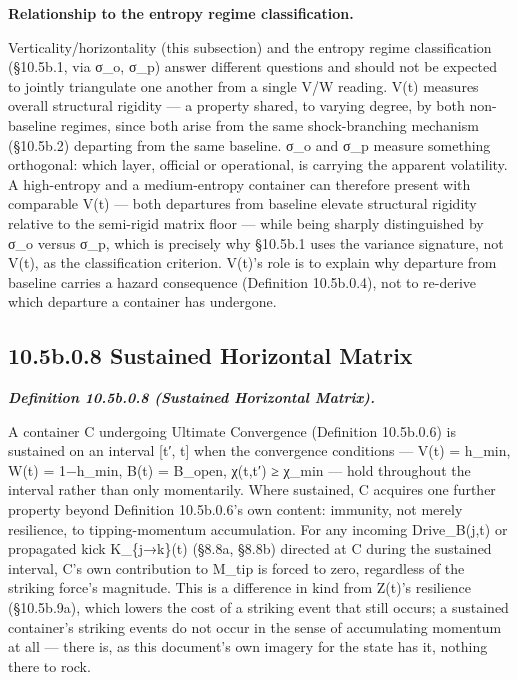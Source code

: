 \documentclass[
]{article}
\begin{document}
\textbf{Relationship to the entropy regime classification.}

Verticality/horizontality (this subsection) and the entropy regime
classification (§10.5b.1, via σ\_o, σ\_p) answer different questions and
should not be expected to jointly triangulate one another from a single
V/W reading. V(t) measures overall structural rigidity --- a property
shared, to varying degree, by both non-baseline regimes, since both
arise from the same shock-branching mechanism (§10.5b.2) departing from
the same baseline. σ\_o and σ\_p measure something orthogonal: which
layer, official or operational, is carrying the apparent volatility. A
high-entropy and a medium-entropy container can therefore present with
comparable V(t) --- both departures from baseline elevate structural
rigidity relative to the semi-rigid matrix floor --- while being sharply
distinguished by σ\_o versus σ\_p, which is precisely why §10.5b.1 uses
the variance signature, not V(t), as the classification criterion.
V(t)'s role is to explain why departure from baseline carries a hazard
consequence (Definition 10.5b.0.4), not to re-derive which departure a
container has undergone.

\hypertarget{b.0.8-sustained-horizontal-matrix}{%
\subsection{10.5b.0.8 Sustained Horizontal
Matrix}\label{b.0.8-sustained-horizontal-matrix}}

\emph{\textbf{Definition 10.5b.0.8 (Sustained Horizontal Matrix).}}

A container C undergoing Ultimate Convergence (Definition 10.5b.0.6) is
sustained on an interval {[}t′, t{]} when the convergence conditions ---
V(t) = h\_min, W(t) = 1−h\_min, B(t) = B\_open, χ(t,t′) ≥ χ\_min ---
hold throughout the interval rather than only momentarily. Where
sustained, C acquires one further property beyond Definition 10.5b.0.6's
own content: immunity, not merely resilience, to tipping-momentum
accumulation. For any incoming Drive\_B(j,t) or propagated kick
K\_\{j→k\}(t) (§8.8a, §8.8b) directed at C during the sustained
interval, C's own contribution to M\_tip is forced to zero, regardless
of the striking force's magnitude. This is a difference in kind from
Z(t)'s resilience (§10.5b.9a), which lowers the cost of a striking event
that still occurs; a sustained container's striking events do not occur
in the sense of accumulating momentum at all --- there is, as this
document's own imagery for the state has it, nothing there to rock.
\end{document}
